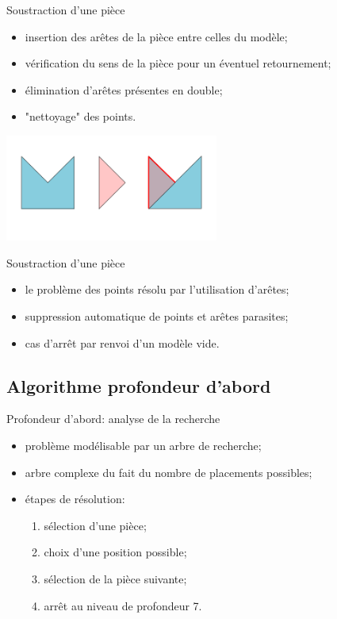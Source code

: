 \documentclass{beamer}
\begin{document}
\begin{frame}{Soustraction d'une pièce}

	\begin{itemize}
		\item insertion des arêtes de la pièce entre celles du modèle;
		\item vérification du sens de la pièce pour un éventuel retournement;
		\item élimination d'arêtes présentes en double;
		\item "nettoyage" des points. 
	\end{itemize}
	
	\begin{center}
		\includegraphics[width=7cm]{soustraction_arete_2}
	\end{center}

\end{frame}

\begin{frame}{Soustraction d'une pièce}

	\begin{itemize}
		\item le problème des points résolu par l'utilisation d'arêtes;
		\item suppression automatique de points et arêtes parasites;
		\item cas d'arrêt par renvoi d'un modèle vide.
	\end{itemize}

\end{frame}

	\subsection{Algorithme profondeur d'abord}
	
\begin{frame}{Profondeur d'abord: analyse de la recherche}

	\begin{itemize}
		\item problème modélisable par un arbre de recherche;
		\item arbre complexe du fait du nombre de placements possibles;
		\item étapes de résolution:
		\begin{enumerate}
			\item sélection d'une pièce;
			\item choix d'une position possible;
			\item sélection de la pièce suivante;
			\item arrêt au niveau de profondeur 7.
		\end{enumerate}
	\end{itemize}

\end{frame}
\end{document}
